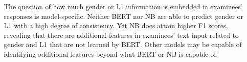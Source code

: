\documentclass [PhD] {uclathes}
\begin{document}
The question of how much gender or L1 information is embedded in examinees' responses is model-specific. Neither BERT nor NB are able to predict gender or L1 with a high degree of consistency. Yet NB does attain higher F1 scores, revealing that there are additional features in examinees' text input related to gender and L1 that are not learned by BERT. Other models may be capable of identifying additional features beyond what BERT or NB is capable of. 


%
%
%

\end{document}
